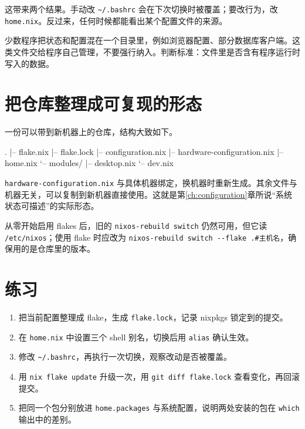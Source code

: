 这带来两个结果。手动改 \texttt{\textasciitilde/.bashrc} 会在下次切换时被覆盖；要改行为，改 \texttt{home.nix}。反过来，任何时候都能看出某个配置文件的来源。

\begin{notebox}
少数程序把状态和配置混在一个目录里，例如浏览器配置、部分数据库客户端。这类文件交给程序自己管理，不要强行纳入。判断标准：文件里是否含有程序运行时写入的数据。
\end{notebox}

\section{把仓库整理成可复现的形态}

一份可以带到新机器上的仓库，结构大致如下。

\begin{textcode}
.
|-- flake.nix
|-- flake.lock
|-- configuration.nix
|-- hardware-configuration.nix
|-- home.nix
`-- modules/
    |-- desktop.nix
    `-- dev.nix
\end{textcode}

\texttt{hardware-configuration.nix} 与具体机器绑定，换机器时重新生成。其余文件与机器无关，可以复制到新机器直接使用。这就是第\ref{ch:configuration}章所说“系统状态可描述”的实际形态。

从零开始启用 flakes 后，旧的 \texttt{nixos-rebuild switch} 仍然可用，但它读 \texttt{/etc/nixos}；使用 flake 时应改为 \texttt{nixos-rebuild switch -{}-flake .\#主机名}，确保用的是仓库里的版本。

\section{练习}

\begin{enumerate}
  \item 把当前配置整理成 flake，生成 \texttt{flake.lock}，记录 nixpkgs 锁定到的提交。
  \item 在 \texttt{home.nix} 中设置三个 shell 别名，切换后用 \texttt{alias} 确认生效。
  \item 修改 \texttt{\textasciitilde/.bashrc}，再执行一次切换，观察改动是否被覆盖。
  \item 用 \texttt{nix flake update} 升级一次，用 \texttt{git diff flake.lock} 查看变化，再回滚提交。
  \item 把同一个包分别放进 \texttt{home.\allowbreak{}packages} 与系统配置，说明两处安装的包在 \texttt{which} 输出中的差别。
\end{enumerate}

